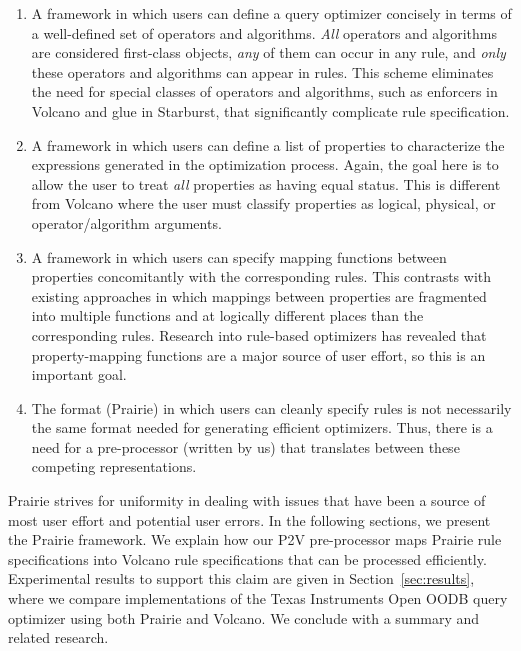 \begin{enumerate}
 \item A framework in which users can define a query optimizer
       concisely in terms of a well-defined set of operators and
       algorithms.  \emph{All} operators and algorithms are considered
       first-class objects, \ie \emph{any} of them can occur in any
       rule, and \emph{only} these operators and algorithms can appear
       in rules.  This scheme eliminates the need for special classes
       of operators and algorithms, such as enforcers in Volcano and
       glue in Starburst, that significantly complicate rule
       specification.
 \item A framework in which users can define a list of properties to
       characterize the expressions generated in the optimization
       process.  Again, the goal here is to allow the user to treat
       \emph{all} properties as having equal status.  This is different
       from Volcano where the user must classify properties as logical,
       physical, or operator/algorithm arguments.
 \item A framework in which users can specify mapping functions
       between properties concomitantly with the corresponding rules.
       This contrasts with existing approaches in which mappings
       between properties are fragmented into multiple functions and at
       logically different places than the corresponding rules.
       Research into rule-based optimizers has revealed that
       property-mapping functions are a major source of user effort, so
       this is an important goal.
 \item The format (Prairie) in which users can cleanly specify rules is
       not necessarily the same format needed for generating efficient
       optimizers.  Thus, there is a need for a pre-processor (written
       by us) that translates between these competing representations.
\end{enumerate}

Prairie strives for uniformity in dealing with issues that have been a
source of most user effort and potential user errors.  In the following
sections, we present the Prairie framework.  We explain how our P2V
pre-processor maps Prairie rule specifications into Volcano rule
specifications that can be processed efficiently.  Experimental results
to support this claim are given in Section~\ref{sec:results}, where we
compare implementations of the Texas Instruments Open OODB query
optimizer using both Prairie and Volcano.  We conclude with a summary
and related research.
